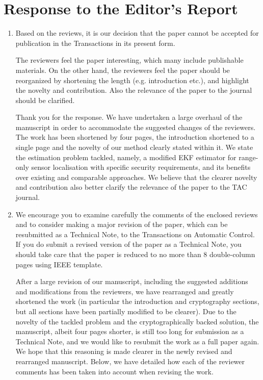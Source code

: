 \documentclass[a4paper]{scrartcl}
\newenvironment{rebuttal}{\begin{enumerate}[label={\color{grey}\thesection.\arabic{enumi}},leftmargin=0pt,ref=\thesection.\arabic{enumi}]}{\end{enumerate}}
\newcommand{\reviewtext}[1]{{\color{nblue} #1}}
\begin{document}
\section*{Response to the Editor's Report}
\def\thesection{E}
\begin{rebuttal} %
\item \reviewtext{Based on the reviews, it is our decision that the paper cannot be accepted for publication in the Transactions in its present form.

The reviewers feel the paper interesting, which many include publishable materials. On the other hand, the reviewers feel the paper should be reorganized by shortening the length (e.g. introduction etc.), and highlight the novelty and contribution. Also the relevance of the paper to the journal should be clarified.}

Thank you for the response. We have undertaken a large overhaul of the manuscript in order to accommodate the suggested changes of the reviewers. The work has been shortened by four pages, the introduction shortened to a single page and the novelty of our method clearly stated within it. We state the estimation problem tackled, namely, a modified EKF estimator for range-only sensor localisation with specific security requirements, and its benefits over existing and comparable approaches. We believe that the clearer novelty and contribution also better clarify the relevance of the paper to the TAC journal.

\item \reviewtext{We encourage you to examine carefully the comments of the enclosed reviews and to consider making a major revision of the paper, which can be resubmitted as a Technical Note, to the Transactions on Automatic Control.  If you do submit a revised version of the paper as a Technical Note, you should take care that the paper is reduced to no
more than 8 double-column pages using IEEE template.}

After a large revision of our manuscript, including the suggested additions and modifications from the reviewers, we have rearranged and greatly shortened the work (in particular the introduction and cryptography sections, but all sections have been partially modified to be clearer). Due to the novelty of the tackled problem and the cryptographically backed solution, the manuscript, albeit four pages shorter, is still too long for submission as a Technical Note, and we would like to resubmit the work as a full paper again. We hope that this reasoning is made clearer in the newly revised and rearranged manuscript. Below, we have detailed how each of the reviewer comments has been taken into account when revising the work.

\end{rebuttal}
\end{document}
